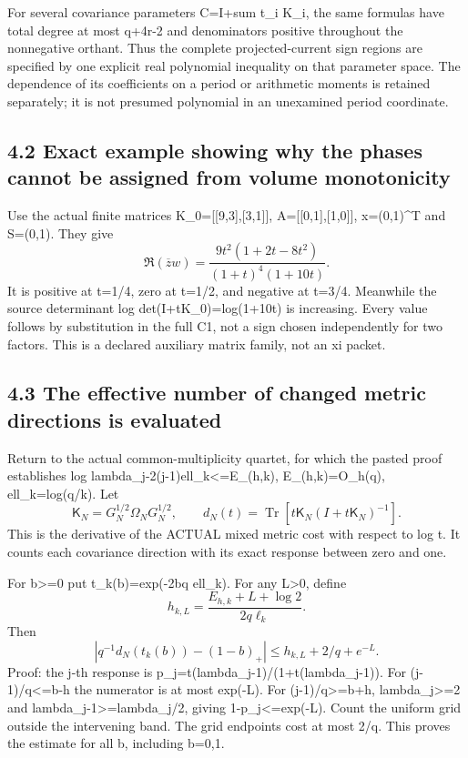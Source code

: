 For several covariance parameters C=I+sum t\_i K\_i, the same formulas have total degree at most q+4r-2 and denominators positive throughout the nonnegative orthant. Thus the complete projected-current sign regions are specified by one explicit real polynomial inequality on that parameter space. The dependence of its coefficients on a period or arithmetic moments is retained separately; it is not presumed polynomial in an unexamined period coordinate.

\subsection{4.2 Exact example showing why the phases cannot be assigned from volume monotonicity}\label{exact-example-showing-why-the-phases-cannot-be-assigned-from-volume-monotonicity}

Use the actual finite matrices K\_0={[}{[}9,3{]},{[}3,1{]}{]}, A={[}{[}0,1{]},{[}1,0{]}{]}, x=(0,1)\^{}T and S=(0,1). They give \[
 \boxed{\Re(\overline z w)=
 \frac{9t^2(1+2t-8t^2)}{(1+t)^4(1+10t)}.}\tag{C5}
\] It is positive at t=1/4, zero at t=1/2, and negative at t=3/4. Meanwhile the source determinant log det(I+tK\_0)=log(1+10t) is increasing. Every value follows by substitution in the full C1, not a sign chosen independently for two factors. This is a declared auxiliary matrix family, not an xi packet.

\subsection{4.3 The effective number of changed metric directions is evaluated}\label{the-effective-number-of-changed-metric-directions-is-evaluated}

Return to the actual common-multiplicity quartet, for which the pasted proof establishes \textbar log lambda\_j-2(j-1)ell\_k\textbar\textless=E\_(h,k), E\_(h,k)=O\_h(q), ell\_k=log(q/k). Let \[
 \mathsf K_N=G_N^{1/2}\Omega_NG_N^{1/2},\qquad
 d_N(t)=\operatorname{Tr}[t\mathsf K_N(I+t\mathsf K_N)^{-1}].
 \tag{C6}
\] This is the derivative of the ACTUAL mixed metric cost with respect to log t. It counts each covariance direction with its exact response between zero and one.

For b\textgreater=0 put t\_k(b)=exp(-2bq ell\_k). For any L\textgreater0, define \[
 h_{k,L}=\frac{E_{h,k}+L+\log2}{2q\ell_k}.
\] Then \[
 \boxed{\left|q^{-1}d_N(t_k(b))-(1-b)_+\right|
 \le h_{k,L}+2/q+e^{-L}.}\tag{C7}
\] Proof: the j-th response is p\_j=t(lambda\_j-1)/(1+t(lambda\_j-1)). For (j-1)/q\textless=b-h the numerator is at most exp(-L). For (j-1)/q\textgreater=b+h, lambda\_j\textgreater=2 and lambda\_j-1\textgreater=lambda\_j/2, giving 1-p\_j\textless=exp(-L). Count the uniform grid outside the intervening band. The grid endpoints cost at most 2/q. This proves the estimate for all b, including b=0,1.


